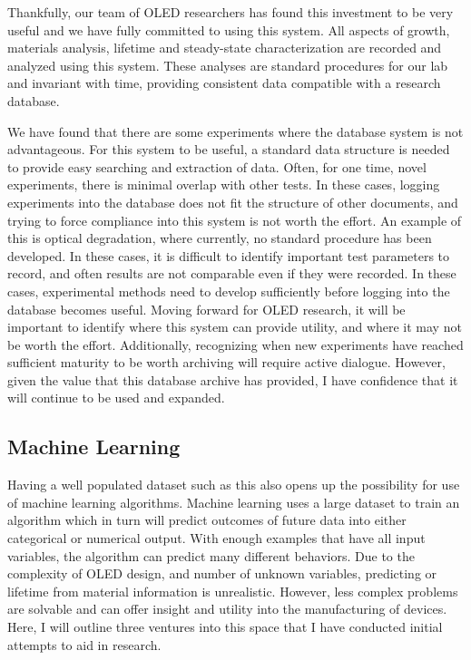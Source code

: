 \documentclass[../thesis.tex]{subfiles}
\begin{document}
Thankfully, our team of OLED researchers has found this investment to be very useful and we have fully committed to using this system.
All aspects of growth, materials analysis, lifetime and steady-state characterization are recorded and analyzed using this system.
These analyses are standard procedures for our lab and invariant with time, providing consistent data compatible with a research database.

We have found that there are some experiments where the database system is not advantageous.
For this system to be useful, a standard data structure is needed to provide easy searching and extraction of data.  
Often, for one time, novel experiments, there is minimal overlap with other tests.  
In these cases, logging experiments into the database does not fit the structure of other documents, and trying to force compliance into this system is not worth the effort.
An example of this is optical degradation, where currently, no standard procedure has been developed.
In these cases, it is difficult to identify important test parameters to record, and often results are not comparable even if they were recorded.
In these cases, experimental methods need to develop sufficiently before logging into the database becomes useful.
Moving forward for OLED research, it will be important to identify where this system can provide utility, and where it may not be worth the effort.
Additionally, recognizing when new experiments have reached sufficient maturity to be worth archiving will require active dialogue.
However, given the value that this database archive has provided, I have confidence that it will continue to be used and expanded.

\subsection{Machine Learning}

Having a well populated dataset such as this also opens up the possibility for use of machine learning algorithms.
Machine learning uses a large dataset to train an algorithm which in turn will predict outcomes of future data into either categorical or numerical output.
With enough examples that have all input variables, the algorithm can predict many different behaviors.
Due to the complexity of OLED design, and number of unknown variables, predicting \eqe or lifetime from material information is unrealistic.
However, less complex problems are solvable and can offer insight and utility into the manufacturing of devices.
Here, I will outline three ventures into this space that I have conducted initial attempts to aid in research.
\end{document}
